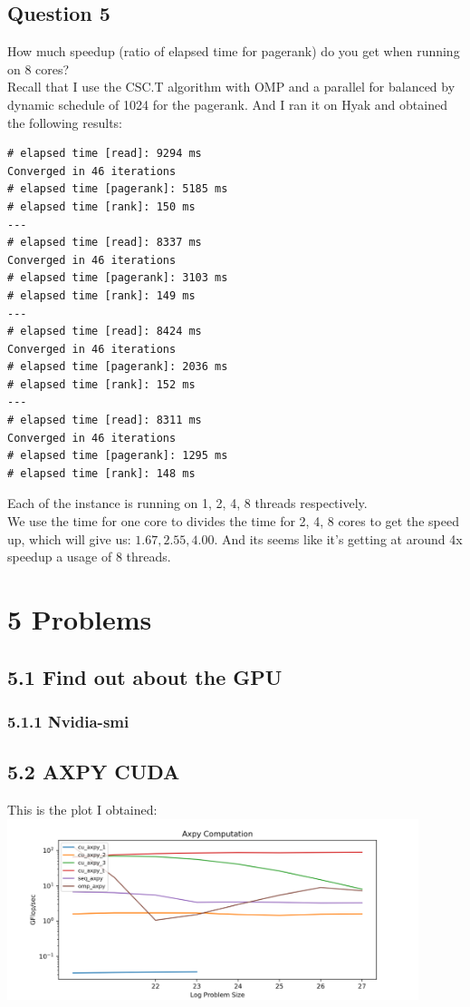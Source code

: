 \documentclass[]{article}
\begin{document}
    \subsection*{Question 5}
    How much speedup (ratio of elapsed time for pagerank) do you get when running on 8 cores?
    \\[1.1em]
    Recall that I use the CSC.T algorithm with OMP and a parallel for balanced by dynamic schedule of 1024 for the pagerank. And I ran it on Hyak and obtained the following results: 
    \begin{lstlisting}
# elapsed time [read]: 9294 ms
Converged in 46 iterations
# elapsed time [pagerank]: 5185 ms
# elapsed time [rank]: 150 ms
---
# elapsed time [read]: 8337 ms
Converged in 46 iterations
# elapsed time [pagerank]: 3103 ms
# elapsed time [rank]: 149 ms
---
# elapsed time [read]: 8424 ms
Converged in 46 iterations
# elapsed time [pagerank]: 2036 ms
# elapsed time [rank]: 152 ms
---
# elapsed time [read]: 8311 ms
Converged in 46 iterations
# elapsed time [pagerank]: 1295 ms
# elapsed time [rank]: 148 ms
    \end{lstlisting}
    Each of the instance is running on 1, 2, 4, 8 threads respectively. 
    \\
    We use the time for one core to divides the time for 2, 4, 8 cores to get the speed up, which will give us: $1.67, 2.55, 4.00$. And its seems like it's getting at around 4x speedup a usage of 8 threads. 
\section*{5 Problems}
    \subsection*{5.1 Find out about the GPU}
        \subsubsection*{5.1.1 Nvidia-smi}
    \subsection*{5.2 AXPY CUDA}
        This is the plot I obtained: 
        \includegraphics[width=12cm]{plt.png}
\end{document}
